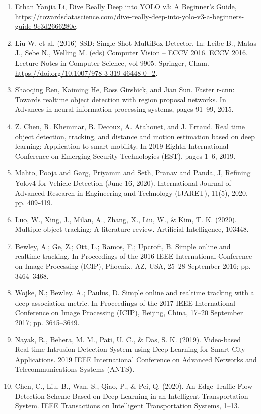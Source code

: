 \begin{enumerate}
    \item Ethan Yanjia Li, Dive Really Deep into YOLO v3: A Beginner’s Guide, \url{https://towardsdatascience.com/dive-really-deep-into-yolo-v3-a-beginners-guide-9e3d2666280e}.
    \item Liu W. et al. (2016) SSD: Single Shot MultiBox Detector. In: Leibe B., Matas J., Sebe N., Welling M. (eds) Computer Vision – ECCV 2016. ECCV 2016. Lecture Notes in Computer Science, vol 9905. Springer, Cham. \url{https://doi.org/10.1007/978-3-319-46448-0_2}.
    \item Shaoqing Ren, Kaiming He, Ross Girshick, and Jian Sun. Faster r-cnn: Towards realtime object detection with region proposal networks. In Advances in neural information processing systems, pages 91–99, 2015.
    \item Z. Chen, R. Khemmar, B. Decoux, A. Atahouet, and J. Ertaud. Real time object detection, tracking, and distance and motion estimation based on deep learning: Application to smart mobility. In 2019 Eighth International Conference on Emerging Security Technologies (EST), pages 1–6, 2019.
    \item Mahto, Pooja and Garg, Priyamm and Seth, Pranav and Panda, J, Refining Yolov4 for Vehicle Detection (June 16, 2020). International Journal of Advanced Research in Engineering and Technology (IJARET), 11(5), 2020, pp. 409-419.
    \item Luo, W., Xing, J., Milan, A., Zhang, X., Liu, W., \& Kim, T. K. (2020). Multiple object tracking: A literature review. Artificial Intelligence, 103448.
    \item Bewley, A.; Ge, Z.; Ott, L.; Ramos, F.; Upcroft, B. Simple online and realtime tracking. In Proceedings of the 2016 IEEE International Conference on Image Processing (ICIP), Phoenix, AZ, USA, 25–28 September 2016; pp. 3464–3468.
    \item Wojke, N.; Bewley, A.; Paulus, D. Simple online and realtime tracking with a deep association metric. In Proceedings of the 2017 IEEE International Conference on Image Processing (ICIP), Beijing, China, 17–20 September 2017; pp. 3645–3649.
    \item Nayak, R., Behera, M. M., Pati, U. C., \& Das, S. K. (2019). Video-based Real-time Intrusion Detection System using Deep-Learning for Smart City Applications. 2019 IEEE International Conference on Advanced Networks and Telecommunications Systems (ANTS).
    \item Chen, C., Liu, B., Wan, S., Qiao, P., \& Pei, Q. (2020). An Edge Traffic Flow Detection Scheme Based on Deep Learning in an Intelligent Transportation System. IEEE Transactions on Intelligent Transportation Systems, 1–13.

\end{enumerate}
